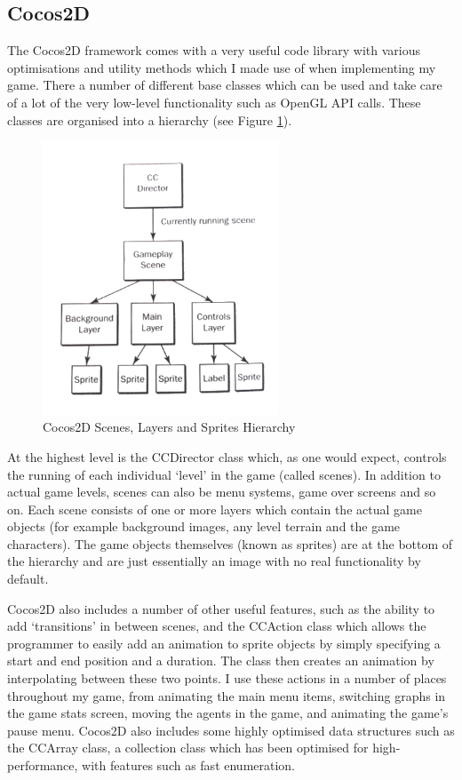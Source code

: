 \documentclass[a4paper,oneside]{report}
\begin{document}
\subsection{Cocos2D} 

The Cocos2D framework comes with a very useful code library with various optimisations and utility methods which I made use of when implementing my game. There a number of different base classes which can be used and take care of a lot of the very low-level functionality such as OpenGL API calls. These classes are organised into a hierarchy (see Figure \ref{fig:Hierarchy}). 

\begin{figure}
  \centering
    \includegraphics[width=70mm]{sources/images/Cocos2DHierarchy}
    \caption{Cocos2D Scenes, Layers and Sprites Hierarchy \cite{Strougo:2011ys}}
    \label{fig:Hierarchy}
\end{figure}

At the highest level is the CCDirector class which, as one would expect, controls the running of each individual `level' in the game (called scenes). In addition to actual game levels, scenes can also be menu systems, game over screens and so on. Each scene consists of one or more layers which contain the actual game objects (for example background images, any level terrain and the game characters). The game objects themselves (known as sprites) are at the bottom of the hierarchy and are just essentially an image with no real functionality by default. 

Cocos2D also includes a number of other useful features, such as the ability to add `transitions' in between scenes, and the CCAction class which allows the programmer to easily add an animation to sprite objects by simply specifying a start and end position and a duration. The class then creates an animation by interpolating between these two points. I use these actions in a number of places throughout my game, from animating the main menu items, switching graphs in the game stats screen, moving the agents in the game, and animating the game's pause menu. Cocos2D also includes some highly optimised data structures such as the CCArray class, a collection class which has been optimised for high-performance, with features such as fast enumeration.
\end{document}
